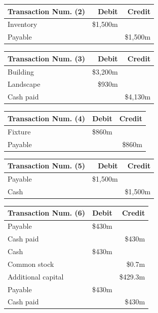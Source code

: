 \documentclass[
  a4paper,
  DIV=11,
  numbers=noendperiod]{scrreprt}
\begin{document}
\begin{longtable}[]{@{}lrr@{}}
\toprule\noalign{}
Transaction Num. (2) & Debit & Credit \\
\midrule\noalign{}
\endhead
\bottomrule\noalign{}
\endlastfoot
Inventory & \$1,500m & \\
Payable & & \$1,500m \\
\end{longtable}

\begin{longtable}[]{@{}lrr@{}}
\toprule\noalign{}
Transaction Num. (3) & Debit & Credit \\
\midrule\noalign{}
\endhead
\bottomrule\noalign{}
\endlastfoot
Building & \$3,200m & \\
Landscape & \$930m & \\
Cash paid & & \$4,130m \\
\end{longtable}

\begin{longtable}[]{@{}lrr@{}}
\toprule\noalign{}
Transaction Num. (4) & Debit & Credit \\
\midrule\noalign{}
\endhead
\bottomrule\noalign{}
\endlastfoot
Fixture & \$860m & \\
Payable & & \$860m \\
\end{longtable}

\begin{longtable}[]{@{}lrr@{}}
\toprule\noalign{}
Transaction Num. (5) & Debit & Credit \\
\midrule\noalign{}
\endhead
\bottomrule\noalign{}
\endlastfoot
Payable & \$1,500m & \\
Cash & & \$1,500m \\
\end{longtable}

\begin{longtable}[]{@{}lrr@{}}
\toprule\noalign{}
Transaction Num. (6) & Debit & Credit \\
\midrule\noalign{}
\endhead
\bottomrule\noalign{}
\endlastfoot
Payable & \$430m & \\
Cash paid & & \$430m \\
Cash & \$430m & \\
Common stock & & \$0.7m \\
Additional capital & & \$429.3m \\
Payable & \$430m & \\
Cash paid & & \$430m \\
\end{longtable}
\end{document}

